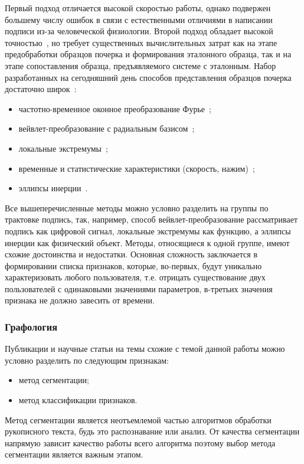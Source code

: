 Первый подход отличается высокой скоростью работы, однако подвержен большему числу ошибок в связи с естественными отличиями в написании подписи из-за человеческой физиологии.
Второй подход обладает высокой точностью~\cite{nelson_kishon}, но требует существенных вычислительных затрат как на этапе предобработки образцов почерка и формирования эталонного образца, так и на этапе сопоставления образца, предъявляемого системе с эталонным.
Набор разработанных на сегодняшний день способов представления образцов почерка достаточно широк~\cite{ivanov_korparate_network}:
\begin{itemize}
  \item частотно-временное оконное преобразование Фурье~\cite{vorona, nalwa, koliadin};
  \item вейвлет-преобразование с радиальным базисом~\cite{leus, anisimova};
  \item локальные экстремумы~\cite{nalwa, zhu_yang_zhu};
  \item временные и статистические характеристики (скорость, нажим)~\cite{bryxomickii, hao_chan, ruchai, doroshenko_koctychenko, lognicov};
  \item эллипсы инерции~\cite{nalwa}.
\end{itemize}

Все вышеперечисленные методы можно условно разделить на группы по трактовке подпись, так, например, способ вейвлет-преобразование рассматривает подпись как цифровой сигнал, локальные экстремумы как функцию, а эллипсы инерции как физический объект. Методы, относящиеся к одной группе, имеют схожие достоинства и недостатки.
Основная сложность заключается в формировании списка признаков, которые, во-первых, будут уникально характеризовать любого пользователя, т.е. отрицать существование двух пользователей с одинаковыми значениями параметров, в-третьих значения признака не должно завесить от времени.

\subsubsection{Графология}
Публикации и научные статьи на темы схожие с темой данной работы можно условно разделить по следующим признакам:
\begin{itemize}
  \item метод сегментации;
  \item метод классификации признаков.
\end{itemize}

Метод сегментации является неотъемлемой частью алгоритмов обработки рукописного текста, будь это распознавание или анализ. От качества сегментации напрямую зависит качество работы всего алгоритма поэтому выбор метода сегментации является важным этапом.


